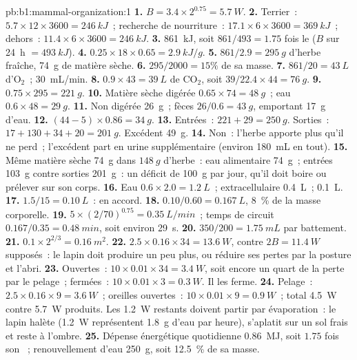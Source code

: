 \begin{solution}{pb:b1:mammal-organization:1}
\textbf{1.} $B = 3.4\times 2^{0.75} = \qty{5.7}{W}$.
\textbf{2.} Terrier~: $5.7\times 12\times 3600 = \qty{246}{kJ}$~;
recherche de nourriture~: $17.1\times 6\times 3600 = \qty{369}{kJ}$~;
dehors~: $11.4\times 6\times 3600 = \qty{246}{kJ}$.
\textbf{3.} \qty{861}{kJ}, soit $861/493 = 1.75$ fois le  ($B$ sur \qty{24}{h} $= \qty{493}{kJ}$).
\textbf{4.} $0.25\times 18\times 0.65 = \qty{2.9}{kJ/g}$.
\textbf{5.} $861/2.9 = \qty{295}{g}$ d'herbe fraîche, \qty{74}{g} de
matière sèche.
\textbf{6.} $295/2000 = 15\%$ de sa masse.
\textbf{7.} $861/20 = \qty{43}{L}$ d'$\mathrm{O_2}$~; \qty{30}{mL/min}.
\textbf{8.} $0.9\times 43 = \qty{39}{L}$ de $\mathrm{CO_2}$, soit $39/22.4\times 44 = \qty{76}{g}$.
\textbf{9.} $0.75\times 295 = \qty{221}{g}$.
\textbf{10.} Matière sèche digérée $0.65\times 74 = \qty{48}{g}$~; eau
$0.6\times 48 = \qty{29}{g}$.
\textbf{11.} Non digérée \qty{26}{g}~; fèces $26/0.6 = \qty{43}{g}$,
emportant \qty{17}{g} d'eau.
\textbf{12.} $(44 - 5)\times 0.86 = \qty{34}{g}$.
\textbf{13.} Entrées~: $221 + 29 = \qty{250}{g}$. Sorties~: $17 + 130 + 34 + 20
= \qty{201}{g}$. Excédent \qty{49}{g}.
\textbf{14.} Non~: l'herbe apporte plus qu'il ne perd~; l'excédent part
en urine supplémentaire (environ \qty{180}{mL} en tout).
\textbf{15.} Même matière sèche \qty{74}{g} dans $\qty{148}{g}$
d'herbe~: eau alimentaire \qty{74}{g}~; entrées \qty{103}{g} contre
sorties \qty{201}{g}~: un déficit de \qty{100}{g} par jour, qu'il doit
boire ou prélever sur son corps.
\textbf{16.} Eau $0.6\times 2.0 = \qty{1.2}{L}$~; extracellulaire
\qty{0.4}{L}~;  \qty{0.1}{L}.
\textbf{17.} $1.5/15 = \qty{0.10}{L}$~: en accord.
\textbf{18.} $0.10/0.60 = \qty{0.167}{L}$, \qty{8}{\%} de la masse corporelle.
\textbf{19.} $5\times(2/70)^{0.75} = \qty{0.35}{L/min}$~; temps de
circuit $0.167/0.35 = \qty{0.48}{min}$, soit environ \qty{29}{s}.
\textbf{20.} $350/200 = \qty{1.75}{mL}$ par battement.
\textbf{21.} $0.1\times 2^{2/3} = \qty{0.16}{m^2}$.
\textbf{22.} $2.5\times 0.16\times 34 = \qty{13.6}{W}$, contre
$2B = \qty{11.4}{W}$ supposés~: le lapin doit produire un peu plus, ou
réduire ses pertes par la posture et l'abri.
\textbf{23.} Ouvertes~: $10\times 0.01\times 34 = \qty{3.4}{W}$, soit
encore un quart de la perte par le pelage~; fermées~: $10\times 0.01\times 3 =
\qty{0.3}{W}$. Il les ferme.
\textbf{24.} Pelage~: $2.5\times 0.16\times 9 = \qty{3.6}{W}$~;
oreilles ouvertes~: $10\times 0.01\times 9 = \qty{0.9}{W}$~; total
\qty{4.5}{W} contre \qty{5.7}{W} produits. Les \qty{1.2}{W} restants
doivent partir par évaporation~: le lapin halète (\qty{1.2}{W}
représentent \qty{1.8}{g} d'eau par heure), s'aplatit sur un sol frais
et reste à l'ombre.
\textbf{25.} Dépense énergétique quotidienne \qty{0.86}{MJ}, soit $1.75$
fois son ~; renouvellement d'eau \qty{250}{g}, soit
\qty{12.5}{\%} de sa masse.
\end{solution}
